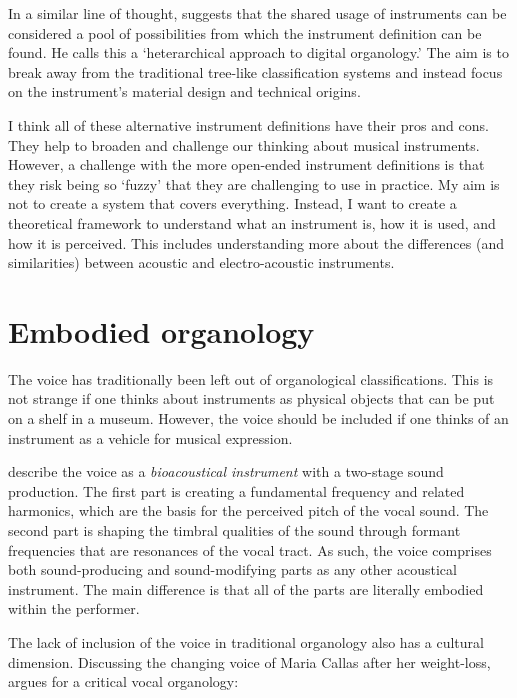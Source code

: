 In a similar line of thought, \citet{magnusson_musical_2017} suggests that the shared usage of instruments can be considered a pool of possibilities from which the instrument definition can be found. He calls this a `heterarchical approach to digital organology.' The aim is to break away from the traditional tree-like classification systems and instead focus on the instrument's material design and technical origins.

I think all of these alternative instrument definitions have their pros and cons. They help to broaden and challenge our thinking about musical instruments. However, a challenge with the more open-ended instrument definitions is that they risk being so `fuzzy' that they are challenging to use in practice. My aim is not to create a system that covers everything. Instead, I want to create a theoretical framework to understand what an instrument is, how it is used, and how it is perceived. This includes understanding more about the differences (and similarities) between acoustic and electro-acoustic instruments.


\section{Embodied organology}\label{sec:voice}

The voice has traditionally been left out of organological classifications. This is not strange if one thinks about instruments as physical objects that can be put on a shelf in a museum. However, the voice should be included if one thinks of an instrument as a vehicle for musical expression.

\citet{kreiman_foundations_2011} describe the voice as a \emph{bioacoustical instrument} with a two-stage sound production. The first part is creating a fundamental frequency and related harmonics, which are the basis for the perceived pitch of the vocal sound. The second part is shaping the timbral qualities of the sound through formant frequencies that are resonances of the vocal tract. As such, the voice comprises both sound-producing and sound-modifying parts as any other acoustical instrument. The main difference is that all of the parts are literally embodied within the performer.

The lack of inclusion of the voice in traditional organology also has a cultural dimension. Discussing the changing voice of Maria Callas after her weight-loss, \citet[p.16]{eidsheim_maria_2017} argues for a critical vocal organology:

